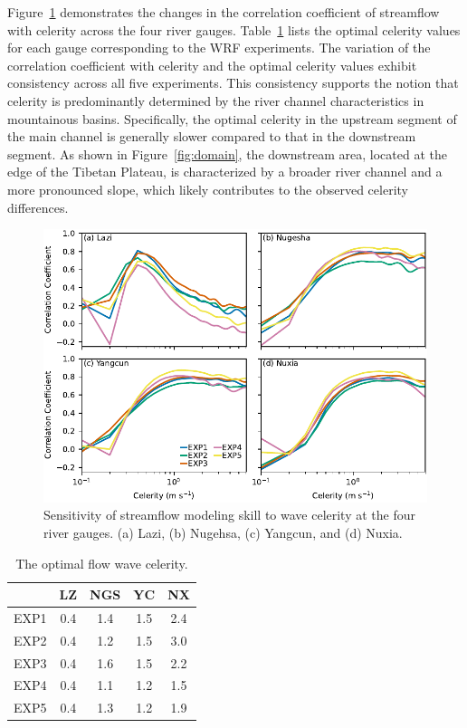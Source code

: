 \documentclass[draft]{agujournal2019}
\begin{document}
Figure~\ref{fig:celerity} demonstrates the changes in the correlation coefficient of streamflow with celerity across the four river gauges. Table~\ref{tab:celerity} lists the optimal celerity values for each gauge corresponding to the WRF experiments. The variation of the correlation coefficient with celerity and the optimal celerity values exhibit consistency across all five experiments. This consistency supports the notion that celerity is predominantly determined by the river channel characteristics in mountainous basins. Specifically, the optimal celerity in the upstream segment of the main channel is generally slower compared to that in the downstream segment. As shown in Figure~\ref{fig:domain}, the downstream area, located at the edge of the Tibetan Plateau, is characterized by a broader river channel and a more pronounced slope, which likely contributes to the observed celerity differences.

\begin{figure}[h!]
  \centering
  \noindent\includegraphics[width=140mm]{q_sens_cc.pdf}
  \caption{Sensitivity of streamflow modeling skill to wave celerity at the four river gauges. (a) Lazi, (b) Nugehsa, (c) Yangcun, and (d) Nuxia. \label{fig:celerity}}
\end{figure}

\begin{table}[h!]
  \centering
  \doublerulesep 0.3pt
  \renewcommand{\arraystretch}{1}  %
  \caption{The optimal flow wave celerity.}
  \label{tab:celerity}
  \vspace*{5mm}
  \small
  \begin{tabular*}{50mm}{ccccc}
    \hline
    & LZ & NGS & YC & NX \\
    \hline
    EXP1 & 0.4 & 1.4 & 1.5 & 2.4 \\
    EXP2 & 0.4 & 1.2 & 1.5 & 3.0 \\
    EXP3 & 0.4 & 1.6 & 1.5 & 2.2 \\
    EXP4 & 0.4 & 1.1 & 1.2 & 1.5 \\
    EXP5 & 0.4 & 1.3 & 1.2 & 1.9 \\
    \hline
  \end{tabular*}
  \renewcommand{\arraystretch}{1}  %
\end{table}
\end{document}
